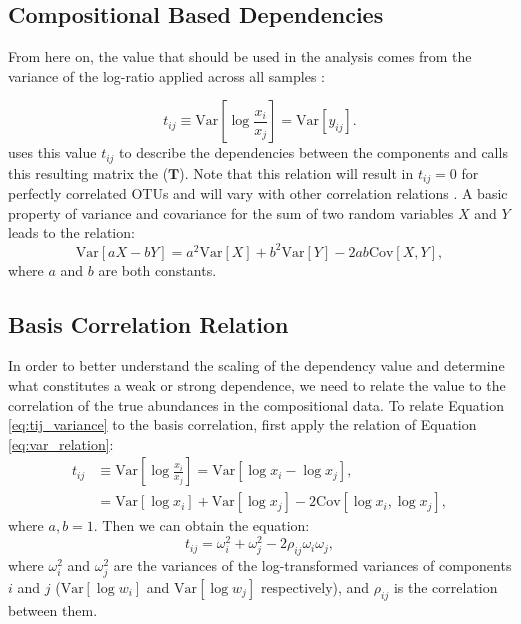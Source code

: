 \subsection{Compositional Based Dependencies}\label{theory-dependencies}


From here on, the value that should be used in the analysis comes from the variance of the log-ratio applied across all samples \citep{Aitchison2003}:

\begin{equation}\label{eq:tij_variance}
    t_{ij} \equiv \text{Var}\left[ \log \frac{x_i}{x_j} \right] = \text{Var} \left[ y_{ij} \right].
\end{equation}
\citeauthor{Aitchison2003} uses this value $t_{ij}$ to describe the dependencies between the components and calls this resulting matrix the  ($\textbf{T}$). Note that this relation will result in $t_{ij}=0$ for perfectly correlated \acrshort{OTU}s and will vary with other correlation relations \citep{Friedman2012}. A basic property of variance and covariance for the sum of two random variables $X$ and $Y$ leads to the relation:
\begin{equation}\label{eq:var_relation}
    \text{Var}\left[aX-bY \right] = a^2 \text{Var}\left[ X \right] + b^2 \text{Var} \left[Y\right]-2ab \text{Cov} \left[X, Y\right],
\end{equation}
where $a$ and $b$ are both constants.

\subsection{Basis Correlation Relation}\label{theory-basiscorr}

In order to better understand the scaling of the dependency value and determine what constitutes a weak or strong dependence, we need to relate the value to the correlation of the true abundances in the compositional data. To relate Equation \ref{eq:tij_variance} to the basis correlation, first apply the relation of Equation \ref{eq:var_relation}:
\begin{equation}\label{eq:basis_correlation}
    \begin{split}
        t_{ij} & \equiv \text{Var}\left[ \log \frac{x_i}{x_j}\right] =\text{Var}\left[ \log x_i - \log x_j \right], \\
        & = \text{Var}\left[ \log x_i\right]+\text{Var}\left[\log x_j\right] - 2\text{Cov}\left[\log x_i, \log x_j\right],
    \end{split}
\end{equation}
where $a,b = 1$. Then we can obtain the equation:
\begin{equation}\label{eq:abun_relation}
    t_{ij} = \omega^2_i + \omega^2_j - 2 \rho_{ij} \omega_i \omega_j,
\end{equation}
where $\omega_i^2$ and $\omega_j^2$ are the variances of the log-transformed variances of components $i$ and $j$ ($\text{Var}\left[ \log w_i\right]$ and $\text{Var}\left[\log w_j\right]$ respectively), and $\rho_{ij}$ is the correlation between them. 


